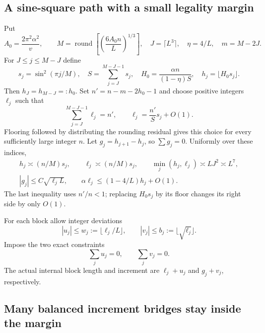 \documentclass[11pt,letterpaper]{article}
\numberwithin{equation}{section}
\theoremstyle{remark}\newtheorem{remark}[theorem]{Remark}
\begin{document}
\subsection{A sine-square path with a small legality margin}

Put
\[
 A_0=\frac{2\pi^2\alpha^2}{v},\qquad
 M=\operatorname{round}\left[\left(\frac{6A_0n}{L}\right)^{1/3}\right],
 \quad J=\lceil L^3\rceil,\quad \eta=4/L,\quad m=M-2J.
\]
For $J\le j\le M-J$ define
\[
 s_j=\sin^2(\pi j/M),\quad
 S=\sum_{j=J}^{M-J-1}s_j,\quad
 H_0=\frac{\alpha n}{(1-\eta)S},\quad
 h_j=\lfloor H_0s_j\rfloor.
\]
Then $h_J=h_{M-J}=:h_0$. Set
$n'=n-m-2h_0-1$ and choose positive integers $\ell_j$ such that
\[
 \sum_{j=J}^{M-J-1}\ell_j=n',\qquad
 \ell_j=\frac{n'}S s_j+O(1).
\]
Flooring followed by distributing the rounding residual gives this
choice for every sufficiently large integer $n$. Let
$g_j=h_{j+1}-h_j$, so $\sum g_j=0$.
Uniformly over these indices,
\begin{gather}
 h_j\asymp (n/M)s_j,\qquad \ell_j\asymp(n/M)s_j,
 \qquad \min_j(h_j,\ell_j)\asymp LJ^2\asymp L^7,
 \label{a61:o2:low:scales}\\
 |g_j|\le C\sqrt{\ell_jL},\qquad
 \alpha\ell_j\le(1-4/L)h_j+O(1).
 \label{a61:o2:low:margin}
\end{gather}
The last inequality uses $n'/n<1$; replacing $H_0s_j$ by its floor
changes its right side by only $O(1)$.

For each block allow integer deviations
\[
 |u_j|\le w_j:=\lfloor\ell_j/L\rfloor,
 \qquad |v_j|\le b_j:=\lfloor\sqrt{\ell_j}\rfloor.
\]
Impose the two exact constraints
\begin{equation}\label{a61:o2:low:balance}
 \sum_j u_j=0,\qquad \sum_jv_j=0.
\end{equation}
The actual internal block length and increment are
$\ell_j+u_j$ and $g_j+v_j$, respectively.

\subsection{Many balanced increment bridges stay inside the margin}
\end{document}
